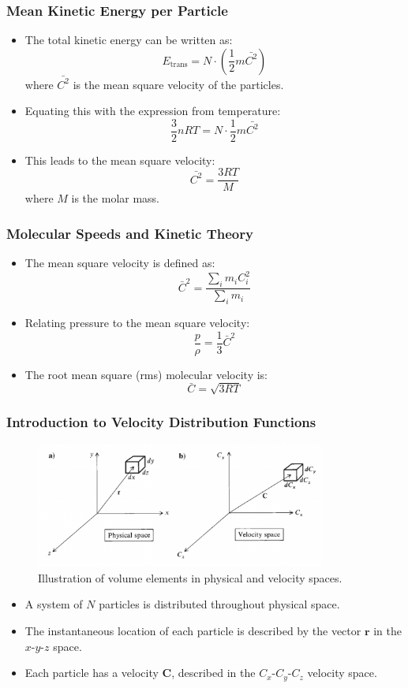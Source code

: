 \documentclass{beamer}
\begin{document}
\begin{frame}
\frametitle{Mean Kinetic Energy per Particle}
\begin{itemize}
    \item The total kinetic energy can be written as:
    \[
    E_{\text{trans}} = N \cdot \left( \frac{1}{2} m \bar{C^2} \right)
    \]
    where $\bar{C^2}$ is the mean square velocity of the particles.
    \item Equating this with the expression from temperature:
    \[
    \frac{3}{2} nRT = N \cdot \frac{1}{2} m \bar{C^2}
    \]
    \item This leads to the mean square velocity:
    \[
   \boxed{\bar{C^2} = \frac{3RT}{M}}
    \]
    where $M$ is the molar mass.
\end{itemize}
\end{frame}



\begin{frame}
\frametitle{Molecular Speeds and Kinetic Theory}
\begin{itemize}
    \item The mean square velocity is defined as:
    \[
    \bar{C}^2 = \frac{\sum_i m_i C_i^2}{\sum_i m_i}
    \]
    \item Relating pressure to the mean square velocity:
    \[
    \frac{p}{\rho} = \frac{1}{3} \bar{C}^2
    \]
    \item The root mean square (rms) molecular velocity is:
    \[
    \bar{C} = \sqrt{3RT}
    \]
\end{itemize}
\end{frame}

\begin{frame}
\frametitle{Introduction to Velocity Distribution Functions}
 \begin{figure}
        \centering
        \includegraphics[width=0.85\textwidth]{phase_space.png}
        \caption{Illustration of volume elements in physical and velocity spaces.}
    \end{figure}
\begin{itemize}
    \item A system of $N$ particles is distributed throughout physical space.
    \item The instantaneous location of each particle is described by the vector $\mathbf{r}$ in the $x$-$y$-$z$ space.
    \item Each particle has a velocity $\mathbf{C}$, described in the $C_x$-$C_y$-$C_z$ velocity space.
\end{itemize}
\end{frame}
\end{document}
